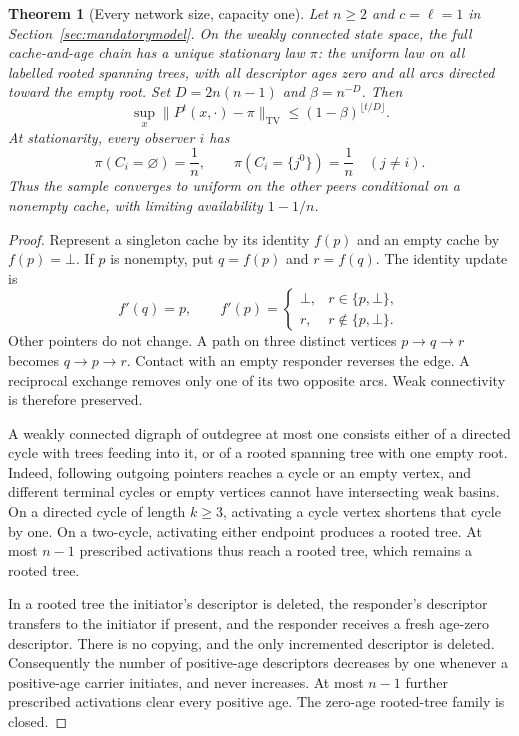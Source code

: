 \documentclass[11pt]{article}
\newtheorem{theorem}{Theorem}
\newcommand{\TV}{\mathrm{TV}}
\begin{document}
\begin{theorem}[Every network size, capacity one]
\label{thm:mandatoryone}
Let $n\ge2$ and $c=\ell=1$ in
Section~\ref{sec:mandatorymodel}. On the weakly connected state
space, the full cache-and-age chain has a unique stationary law
$\pi$: the uniform law on all labelled rooted spanning trees,
with all descriptor ages zero and all arcs directed toward the
empty root. Set $D=2n(n-1)$ and $\beta=n^{-D}$. Then
\[
 \sup_x\|P^t(x,\cdot)-\pi\|_{\TV}
 \le(1-\beta)^{\lfloor t/D\rfloor}.
\]
At stationarity, every observer $i$ has
\[
 \pi(C_i=\varnothing)=\frac1n,\qquad
 \pi(C_i=\{j^0\})=\frac1n\quad(j\ne i).
\]
Thus the sample converges to uniform on the other peers conditional
on a nonempty cache, with limiting availability $1-1/n$.
\end{theorem}
\begin{proof}
Represent a singleton cache by its identity $f(p)$ and an empty
cache by $f(p)=\bot$. If $p$ is nonempty, put $q=f(p)$ and
$r=f(q)$. The identity update is
\[
 f'(q)=p,\qquad
 f'(p)=
 \begin{cases}
  \bot,& r\in\{p,\bot\},\\
  r,& r\notin\{p,\bot\}.
 \end{cases}
\]
Other pointers do not change. A path on three distinct vertices
$p\to q\to r$ becomes $q\to p\to r$. Contact with an empty
responder reverses the edge. A reciprocal exchange removes only
one of its two opposite arcs. Weak connectivity is therefore
preserved.

A weakly connected digraph of outdegree at most one consists
either of a directed cycle with trees feeding into it, or of a
rooted spanning tree with one empty root. Indeed, following outgoing
pointers reaches a cycle or an empty vertex, and different terminal
cycles or empty vertices cannot have intersecting weak basins.
On a directed cycle of length $k\ge3$, activating a cycle vertex
shortens that cycle by one. On a two-cycle, activating either
endpoint produces a rooted tree. At most $n-1$ prescribed
activations thus reach a rooted tree, which remains a rooted tree.

In a rooted tree the initiator's descriptor is deleted, the
responder's descriptor transfers to the initiator if present, and
the responder receives a fresh age-zero descriptor. There is no
copying, and the only incremented descriptor is deleted.
Consequently the number of positive-age descriptors decreases by
one whenever a positive-age carrier initiates, and never increases.
At most $n-1$ further prescribed activations clear every positive
age. The zero-age rooted-tree family is closed.


\end{proof}
\end{document}

